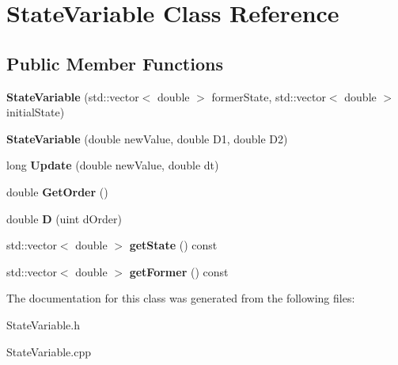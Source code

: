 \hypertarget{classStateVariable}{}\section{State\+Variable Class Reference}
\label{classStateVariable}
\subsection*{Public Member Functions}
\begin{DoxyCompactItemize}
\item 
\mbox{\label{classStateVariable_a7ef7b4dc969e227b1e12930194e6b5fe}} 
{\bfseries State\+Variable} (std\+::vector$<$ double $>$ former\+State, std\+::vector$<$ double $>$ initial\+State)
\item 
\mbox{\label{classStateVariable_a300c97c1424f1e0478dd937d6249f297}} 
{\bfseries State\+Variable} (double new\+Value, double D1, double D2)
\item 
\mbox{\label{classStateVariable_af7cd47c400edd24b4511850f52106eb3}} 
long {\bfseries Update} (double new\+Value, double dt)
\item 
\mbox{\label{classStateVariable_a33a3fb44ef5d342969646fa8384d3b4d}} 
double {\bfseries Get\+Order} ()
\item 
\mbox{\label{classStateVariable_ad737957a2d383797dae8e693db13307f}} 
double {\bfseries D} (uint d\+Order)
\item 
\mbox{\label{classStateVariable_a12151f30b145f1301bda0e03952f5d4b}} 
std\+::vector$<$ double $>$ {\bfseries get\+State} () const
\item 
\mbox{\label{classStateVariable_a2b5b85129f539b4d819977c8da45ba63}} 
std\+::vector$<$ double $>$ {\bfseries get\+Former} () const
\end{DoxyCompactItemize}


The documentation for this class was generated from the following files\+:\begin{DoxyCompactItemize}
\item 
State\+Variable.\+h\item 
State\+Variable.\+cpp\end{DoxyCompactItemize}
